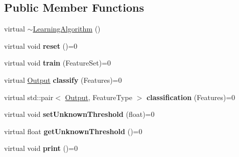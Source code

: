 \subsection*{Public Member Functions}
\begin{DoxyCompactItemize}
\item 
virtual \hyperlink{classLearningAlgorithm_a0ec630ac5340988eea92b8ede9a4422d}{$\sim$LearningAlgorithm} ()
\item 
\hypertarget{classLearningAlgorithm_a43578336f77312cfc2aac189034d9d78}{
virtual void {\bfseries reset} ()=0}
\label{classLearningAlgorithm_a43578336f77312cfc2aac189034d9d78}

\item 
\hypertarget{classLearningAlgorithm_a241f4be6894d83d6a61bfa0689fee874}{
virtual void {\bfseries train} (FeatureSet)=0}
\label{classLearningAlgorithm_a241f4be6894d83d6a61bfa0689fee874}

\item 
\hypertarget{classLearningAlgorithm_a5460eb0cc848daf0f84c5fc7093fe94b}{
virtual \hyperlink{structOutput}{Output} {\bfseries classify} (Features)=0}
\label{classLearningAlgorithm_a5460eb0cc848daf0f84c5fc7093fe94b}

\item 
\hypertarget{classLearningAlgorithm_a188698bec0d1d94f573521c9a0f1e831}{
virtual std::pair$<$ \hyperlink{structOutput}{Output}, FeatureType $>$ {\bfseries classification} (Features)=0}
\label{classLearningAlgorithm_a188698bec0d1d94f573521c9a0f1e831}

\item 
\hypertarget{classLearningAlgorithm_a77ba7b2046ba7015fca9f7f1262ca2f0}{
virtual void {\bfseries setUnknownThreshold} (float)=0}
\label{classLearningAlgorithm_a77ba7b2046ba7015fca9f7f1262ca2f0}

\item 
\hypertarget{classLearningAlgorithm_ab8294855692cdef11461c97942f6239f}{
virtual float {\bfseries getUnknownThreshold} ()=0}
\label{classLearningAlgorithm_ab8294855692cdef11461c97942f6239f}

\item 
\hypertarget{classLearningAlgorithm_aa2faa60adbe835f0748cb1b47f822379}{
virtual void {\bfseries print} ()=0}
\label{classLearningAlgorithm_aa2faa60adbe835f0748cb1b47f822379}

\end{DoxyCompactItemize}


